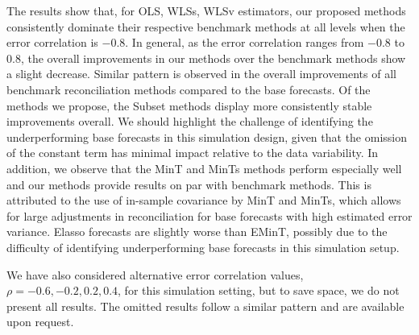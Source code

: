 \documentclass[11pt,a4paper,]{article}
\begin{document}
The results show that, for OLS, WLSs, WLSv estimators, our proposed
methods consistently dominate their respective benchmark methods at all
levels when the error correlation is \(-0.8\). In general, as the error
correlation ranges from \(-0.8\) to \(0.8\), the overall improvements in
our methods over the benchmark methods show a slight decrease. Similar
pattern is observed in the overall improvements of all benchmark
reconciliation methods compared to the base forecasts. Of the methods we
propose, the Subset methods display more consistently stable
improvements overall. We should highlight the challenge of identifying
the underperforming base forecasts in this simulation design, given that
the omission of the constant term has minimal impact relative to the
data variability. In addition, we observe that the MinT and MinTs
methods perform especially well and our methods provide results on par
with benchmark methods. This is attributed to the use of in-sample
covariance by MinT and MinTs, which allows for large adjustments in
reconciliation for base forecasts with high estimated error variance.
Elasso forecasts are slightly worse than EMinT, possibly due to the
difficulty of identifying underperforming base forecasts in this
simulation setup.

We have also considered alternative error correlation values,
\(\rho = -0.6, -0.2, 0.2, 0.4\), for this simulation setting, but to
save space, we do not present all results. The omitted results follow a
similar pattern and are available upon request.
\end{document}
